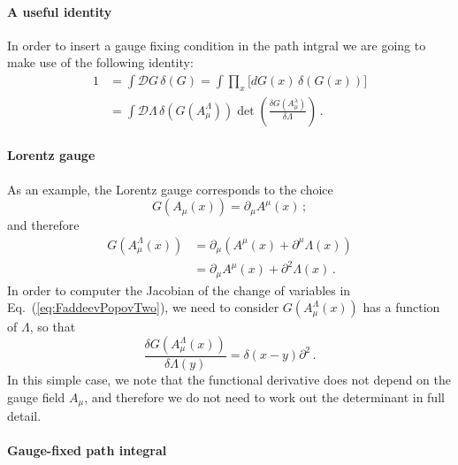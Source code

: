 \paragraph{A useful identity}

In order to insert a gauge fixing condition in the path intgral we are
going to make use of the following identity:
\begin{align} 
  \label{eq:FaddeevPopovOne}
  1 &= \int \mathcal{D}G\, \delta(G) = 
      \int \prod_x \Big[ dG(x)\, \delta\left(G(x)\right) \Big]\\
  \label{eq:FaddeevPopovTwo}
    &= \int \mathcal{D}\Lambda\, \delta\left(G\left(
      A^\Lambda_\mu\right)\right)
      \det \left(
      \frac{\delta G\left(A^\lambda_\mu\right)}{\delta \Lambda}
      \right)\, .
\end{align}

\paragraph{Lorentz gauge}

As an example, the Lorentz gauge corresponds to the choice
\begin{equation}
  \label{eq:LorentzGauge}
  G\left(A_\mu(x)\right) = \partial_\mu A^\mu(x)\, ; 
\end{equation}
and therefore
\begin{align}
  G\left(A^\Lambda_\mu(x)\right)
  &= \partial_\mu\left(A^\mu(x) + \partial^\mu\Lambda(x)\right) \\
  &= \partial_\mu A^\mu(x) + \partial^2 \Lambda(x)\, .
\end{align}
In order to computer the Jacobian of the change of variables in
Eq.~(\ref{eq:FaddeevPopovTwo}), we need to consider
$G\left(A^\Lambda_\mu(x)\right)$ has a function of $\Lambda$, so that
\begin{equation}
  \label{eq:GaugeFixDeriv}
  \frac{\delta G\left(A^\Lambda_\mu(x)\right)}{\delta \Lambda(y)} = 
  \delta(x-y) \partial^2\, .
\end{equation}
In this simple case, we note that the functional derivative does not
depend on the gauge field $A_\mu$, and therefore we do not need to
work out the determinant in full detail. 

\paragraph{Gauge-fixed path integral}

